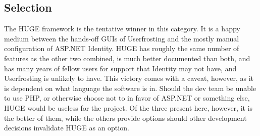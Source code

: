 \documentclass[onecolumn, draftclsnofoot,10pt, compsoc]{IEEEtran}
\begin{document}
\subsection{Selection}
The HUGE framework is the tentative winner in this category. It is a happy medium between the hands-off GUIs of Userfrosting and the mostly manual configuration of ASP.NET Identity.
HUGE has roughly the same number of features as the other two combined, is much better documented than both, and has many years of fellow users for support that Identity may
not have, and Userfrosting is unlikely to have. This victory comes with a caveat, however, as it is dependent on what language the software is in. Should the dev team be unable to
use PHP, or otherwise choose not to in favor of ASP.NET or something else, HUGE would be useless for the project. Of the three present here, however, it is the better of them, 
while the others provide options should other development decisions invalidate HUGE as an option.

\end{document}
